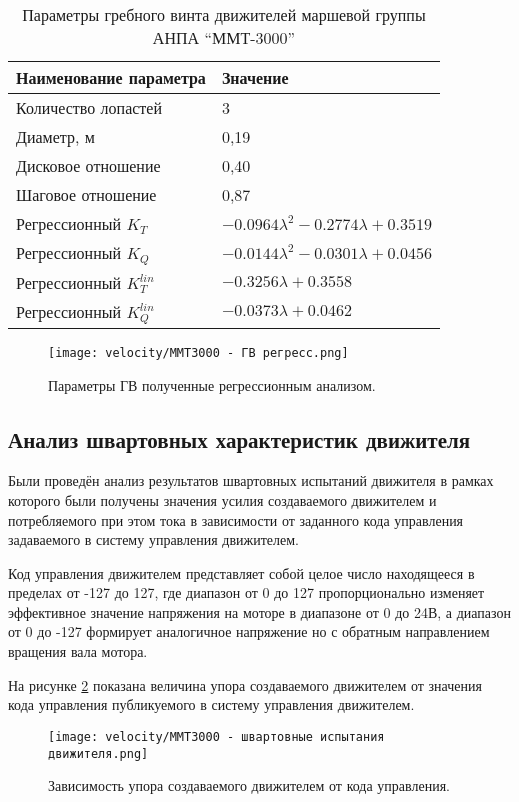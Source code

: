 \begin{table}
    \caption{Параметры гребного винта движителей маршевой группы АНПА ``ММТ-3000''
    }
    \label{tab:mmt3000_propeller}
    \centering
    \begin{tabular}{ll}
        \toprule
        Наименование параметра  & Значение\\
        \midrule
        Количество лопастей & 3 \\
        Диаметр, м & 0,19 \\
        Дисковое отношение & 0,40 \\
        Шаговое отношение & 0,87 \\
        Регрессионный $K_T$ & $-0.0964\lambda^2 -0.2774\lambda + 0.3519$ \\
        Регрессионный $K_Q$ & $-0.0144\lambda^2 -0.0301\lambda + 0.0456$ \\
        Регрессионный $K_T^{lin}$ & $-0.3256\lambda + 0.3558$ \\
        Регрессионный $K_Q^{lin}$ & $-0.0373\lambda + 0.0462$ \\
        \bottomrule
    \end{tabular}
\end{table}

\begin{figure}[ht]
    \centering
    \texttt{[image: velocity/MMT3000 - ГВ регресс.png]}
    \caption{Параметры ГВ полученные регрессионным анализом.}
    \label{fig:mmt3000_propeller}
\end{figure}

\subsection{Анализ швартовных характеристик движителя}
Были проведён анализ результатов швартовных испытаний движителя в рамках которого были получены значения усилия создаваемого движителем и потребляемого при этом тока в зависимости от заданного кода управления задаваемого в систему управления движителем.

Код управления движителем представляет собой целое число находящееся в пределах от -127 до 127, где диапазон от 0 до 127 пропорционально изменяет эффективное значение напряжения на моторе в диапазоне от 0 до 24В, а диапазон от 0 до -127 формирует аналогичное напряжение но с обратным направлением вращения вала мотора.

На рисунке \ref{fig:mmt3000_bollardpul} показана величина упора создаваемого движителем от значения кода управления публикуемого в систему управления движителем.
\begin{figure}[ht]
    \centering
    \texttt{[image: velocity/MMT3000 - швартовные испытания движителя.png]}
    \caption{Зависимость упора создаваемого движителем от кода управления.}
    \label{fig:mmt3000_bollardpul}
\end{figure}

